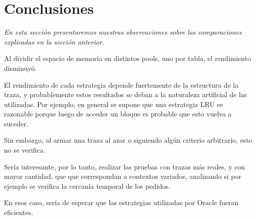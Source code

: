 \section{Conclusiones}

\textsl{En esta secci\'on presentaremos nuestras observaciones
sobre las comparaciones explicadas en la secci\'on anterior.}

\vspace*{0.5cm}

Al dividir el espacio de memoria en distintos pools, uno por tabla,
el rendimiento disminuyó.

\vspace*{0.3cm}

El rendimiento de cada estrategia depende fuertemente de la 
estructura de la traza, y probablemente estos resultados se 
deban a la naturaleza artificial de las utilizadas. 
Por ejemplo, en general se supone que una estrategia LRU es
razonable porque luego de acceder un bloque es probable que 
esto vuelva a suceder. 

Sin embargo, al armar una traza al azar o siguiendo algún 
criterio arbitrario, esto no se verifica.


Sería interesante, por lo tanto, realizar las pruebas con 
trazas más reales, y con mayor cantidad, que que correspondan 
a contextos variados, analizando si por ejemplo se verifica la
cercanía temporal de los pedidos.

En esos caso, sería de esperar que las estrategias utilizadas
por Oracle fueran eficientes.






